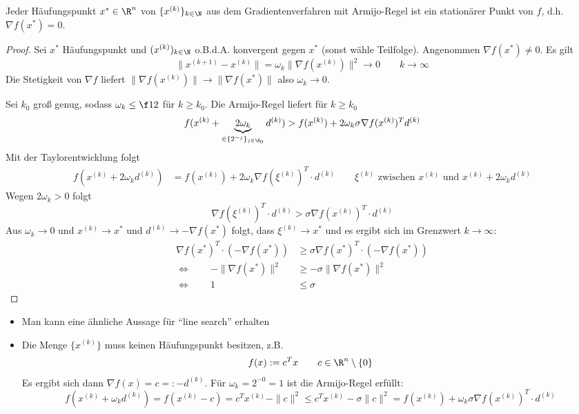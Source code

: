 \documentclass[11pt]{scrartcl}
\begin{document}
\begin{st}[Konvergenz] \label{4.8}
	 Jeder Häufungspunkt $x^* \in \R^n$ von $\{x^{(k)}\}_{k\in \N}$ aus dem Gradientenverfahren mit Armijo-Regel ist ein stationärer Punkt von $f$, d.h. $\nabla f(x^*) = 0$.
	 \begin{proof}
	 	Sei $x^*$ Häufungspunkt und $(x^{(k)})_{k\in \N}$ o.B.d.A. konvergent gegen $x^*$ (sonst wähle Teilfolge).
		Angenommen $\nabla f(x^*) \neq 0$.
		Es gilt
		\[
			\|x^{(k+1)} - x^{(k)}\| = \omega_k \|\nabla f(x^{(k)})\|^2 \to 0 \qquad k\to \infty
		\]
		Die Stetigkeit von $\nabla f$ liefert $\|\nabla f(x^{(k)})\| \to \|\nabla f(x^*)\|$ also $\omega_k \to 0$.

		Sei $k_0$ groß genug, sodass $\omega_k \le \f 12$ für $k \ge k_0$.
		Die Armijo-Regel liefert für $k\ge k_0$
		\[
			f(x^{(k)} + \underbrace{2 \omega_k}_{\in \{2^{-j}\}_{j\in \N_0}} d^{(k)}) > f(x^{(k)}) + 2 \omega_k \sigma \nabla f(x^{(k)})^T d^{(k)}
		\]
		Mit der Taylorentwicklung folgt
		\begin{align*}
			f(x^{(k)} + 2\omega_k d^{(k)}) 
			&= f(x^{(k)}) + 2 \omega_k \nabla f(\xi^{(k)})^T \cdot d^{(k)}  \qquad \xi^{(k)} \text{ zwischen $x^{(k)}$ und $x^{(k)} + 2 \omega_k d^{(k)}$}
		\end{align*}
		Wegen $2 \omega_k > 0$ folgt
		\[
			\nabla f(\xi^{(k)})^T \cdot d^{(k)} > \sigma \nabla f(x^{(k)})^T \cdot d^{(k)}
		\]
		Aus $\omega_k \to 0$ und $x^{(k)} \to x^*$ und $d^{(k)} \to -\nabla f(x^*)$ folgt, dass $\xi^{(k)} \to x^*$ und es ergibt sich im Grenzwert $k\to \infty$:
		\begin{align*}
			\nabla f(x^*)^T\cdot (-\nabla f(x^*)) &\ge \sigma \nabla f(x^*)^T \cdot (-\nabla f(x^*)) \\
			\iff \qquad -\|\nabla f(x^*)\|^2 &\ge - \sigma \|\nabla f(x^*)\|^2 \\
			\iff \qquad 1 &\le \sigma
		\end{align*}
	 \end{proof}
	 \begin{note}
		 \begin{itemize}
		 	\item
		 		Man kann eine ähnliche Aussage für “line search” erhalten
			\item
				Die Menge $\{x^{(k)}\}$ muss keinen Häufungspunkt besitzen, z.B.
				\[
					f(x) := c^T x \qquad c \in \R^n \setminus\{0\}
				\]
				Es ergibt sich dann $\nabla f(x) = c =: -d^{(k)}$.
				Für $\omega_k = 2^{-0} = 1$ ist die Armijo-Regel erfüllt:
				\[
					f(x^{(k)} +\omega_k d^{(k)}) = f(x^{(k)} - c) = c^T x^{(k)} - \|c\|^2 \le c^T x^{(k)} - \sigma \|c\|^2 = f(x^{(k)}) + \omega_k \sigma \nabla f(x^{(k)})^T \cdot d^{(k)}
\]
\end{itemize}
\end{note}
\end{st}
\end{document}
